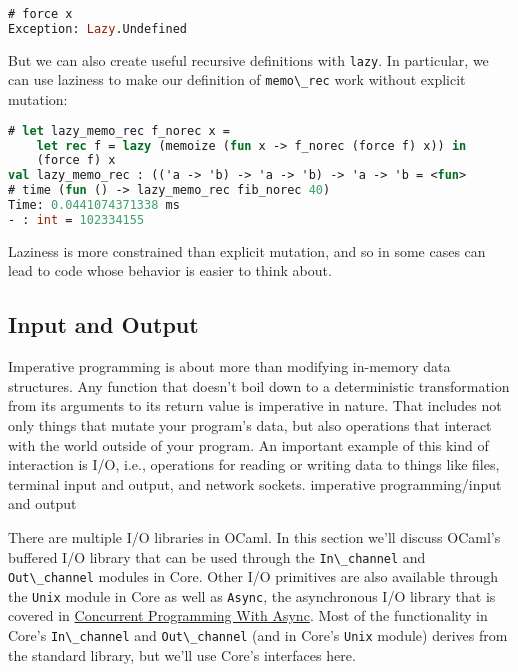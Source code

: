\begin{lstlisting}[language=Caml]
# force x
Exception: Lazy.Undefined
\end{lstlisting}

But we can also create useful recursive definitions with
\passthrough{\lstinline!lazy!}. In particular, we can use laziness to
make our definition of \passthrough{\lstinline!memo\_rec!} work without
explicit mutation:

\begin{lstlisting}[language=Caml]
# let lazy_memo_rec f_norec x =
    let rec f = lazy (memoize (fun x -> f_norec (force f) x)) in
    (force f) x
val lazy_memo_rec : (('a -> 'b) -> 'a -> 'b) -> 'a -> 'b = <fun>
# time (fun () -> lazy_memo_rec fib_norec 40)
Time: 0.0441074371338 ms
- : int = 102334155
\end{lstlisting}

Laziness is more constrained than explicit mutation, and so in some
cases can lead to code whose behavior is easier to think about. ~

\hypertarget{input-and-output}{%
\subsection{Input and Output}\label{input-and-output}}

Imperative programming is about more than modifying in-memory data
structures. Any function that doesn't boil down to a deterministic
transformation from its arguments to its return value is imperative in
nature. That includes not only things that mutate your program's data,
but also operations that interact with the world outside of your
program. An important example of this kind of interaction is I/O, i.e.,
operations for reading or writing data to things like files, terminal
input and output, and network sockets.
\protect\hypertarget{IPinpout}{}{imperative programming/input and
output}

There are multiple I/O libraries in OCaml. In this section we'll discuss
OCaml's buffered I/O library that can be used through the
\passthrough{\lstinline!In\_channel!} and
\passthrough{\lstinline!Out\_channel!} modules in Core. Other I/O
primitives are also available through the \passthrough{\lstinline!Unix!}
module in Core as well as \passthrough{\lstinline!Async!}, the
asynchronous I/O library that is covered in
\href{concurrent-programming.html\#concurrent-programming-with-async}{Concurrent
Programming With Async}. Most of the functionality in Core's
\passthrough{\lstinline!In\_channel!} and
\passthrough{\lstinline!Out\_channel!} (and in Core's
\passthrough{\lstinline!Unix!} module) derives from the standard
library, but we'll use Core's interfaces here.

